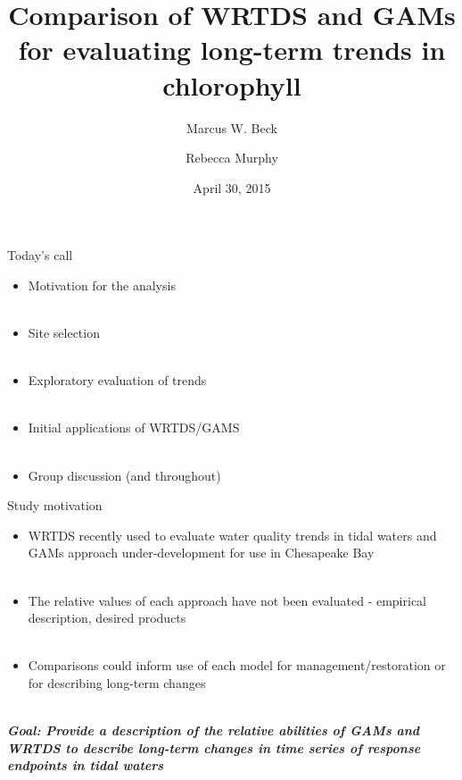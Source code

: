 \documentclass[serif]{beamer}\usepackage[]{graphicx}\usepackage[]{color}
\newcommand{\Bigtxt}[1]{\textbf{\textit{#1}}}
\begin{document}
\title[Comparison of WRTDS and GAMs]{Comparison of WRTDS and GAMs for evaluating long-term trends in chlorophyll}

\author[Beck, Murphy]{Marcus W. Beck \and Rebecca Murphy}

\date{April 30, 2015}


\begin{frame}
\titlepage
\end{frame}

\begin{frame}{Today's call}
\begin{itemize}
\item Motivation for the analysis \\~\\
\item Site selection \\~\\
\item Exploratory evaluation of trends \\~\\
\item Initial applications of WRTDS/GAMS \\~\\
\item Group discussion (and throughout) 
\end{itemize}
\end{frame}

\begin{frame}{Study motivation}
\begin{itemize}
\item WRTDS recently used to evaluate water quality trends in tidal waters and GAMs approach under-development for use in Chesapeake Bay\\~\\
\item The relative values of each approach have not been evaluated - empirical description, desired products \\~\\
\item Comparisons could inform use of each model for management/restoration or for describing long-term changes \\~\\
\end{itemize}
\Bigtxt{Goal: Provide a description of the relative abilities of GAMs and WRTDS to describe long-term changes in time series of response endpoints in tidal waters}
\end{frame}
\end{document}
